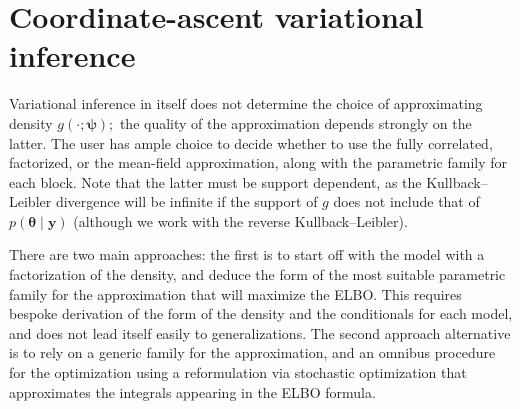 \documentclass[
  11pt,
  letterpaper,
]{scrbook}
\theoremstyle{definition}
\theoremstyle{plain}
\theoremstyle{plain}
\theoremstyle{plain}
\theoremstyle{definition}
\theoremstyle{definition}
\theoremstyle{remark}
\begin{document}
\section{Coordinate-ascent variational
inference}\label{coordinate-ascent-variational-inference}

Variational inference in itself does not determine the choice of
approximating density \(g(\cdot; \boldsymbol{\psi});\) the quality of
the approximation depends strongly on the latter. The user has ample
choice to decide whether to use the fully correlated, factorized, or the
mean-field approximation, along with the parametric family for each
block. Note that the latter must be support dependent, as the
Kullback--Leibler divergence will be infinite if the support of \(g\)
does not include that of \(p(\boldsymbol{\theta} \mid \boldsymbol{y})\)
(although we work with the reverse Kullback--Leibler).

There are two main approaches: the first is to start off with the model
with a factorization of the density, and deduce the form of the most
suitable parametric family for the approximation that will maximize the
ELBO. This requires bespoke derivation of the form of the density and
the conditionals for each model, and does not lead itself easily to
generalizations. The second approach alternative is to rely on a generic
family for the approximation, and an omnibus procedure for the
optimization using a reformulation via stochastic optimization that
approximates the integrals appearing in the ELBO formula.
\end{document}
